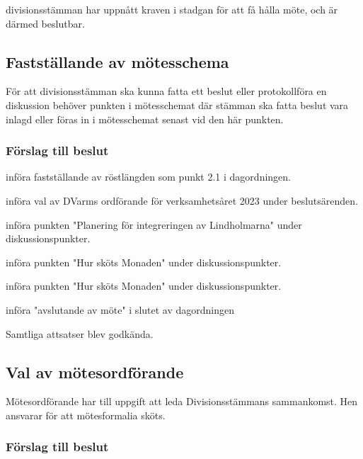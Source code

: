 \documentclass[protokoll]{dvd}
\begin{document}
\begin{attsatser}
    \item divisionsstämman har uppnått kraven i stadgan för att få hålla möte, och är därmed beslutbar.
\end{attsatser}

\subsection{Fastställande av mötesschema}

För att divisionsstämman ska kunna fatta ett beslut eller protokollföra en diskussion behöver punkten i mötesschemat där stämman ska fatta beslut vara inlagd eller föras in i mötesschemat senast vid den här punkten.

\subsubsection*{Förslag till beslut}

\begin{attsatser}
    \item införa fastställande av röstlängden som punkt 2.1 i dagordningen.
    \item införa val av DVarms ordförande för verksamhetsåret 2023 under beslutsärenden.
    \item införa punkten "Planering för integreringen av Lindholmarna" under diskussionspunkter.
    \item införa punkten "Hur sköts Monaden" under diskussionspunkter.
    \item införa punkten "Hur sköts Monaden" under diskussionspunkter.
    \item införa "avslutande av möte" i slutet av dagordningen
\end{attsatser}

Samtliga attsatser blev godkända.

\subsection{Val av mötesordförande}

Mötesordförande har till uppgift att leda Divisionsstämmans sammankomst.
Hen ansvarar för att mötesformalia sköts.

\subsubsection*{Förslag till beslut}
\end{document}
